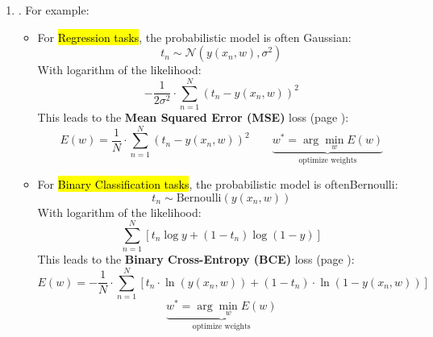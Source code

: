 \begin{enumerate}
    \item {}. For example:
    \begin{itemize}
        \item For \hl{Regression tasks}, the probabilistic model is often Gaussian:
        \begin{equation*}
            t_{n} \sim \mathcal{N}\left(y\left(x_{n}, w\right), \sigma^{2}\right)
        \end{equation*}
        With logarithm of the likelihood:
        \begin{equation*}
            -\dfrac{1}{2 \sigma^{2}} \cdot \sum_{n=1}^{N} \left(t_{n} - y\left(x_{n}, w\right)\right)^{2}
        \end{equation*}
        This leads to the \textbf{Mean Squared Error (MSE)} loss (page \pageref{eq:mse}):
        \begin{equation*}
            E(w) = \dfrac{1}{N} \cdot \sum_{n=1}^{N} \left(t_{n} - y\left(x_{n}, w\right)\right)^{2} \qquad \underbrace{w^{*} = \arg\min_{w} E(w)}_{\text{optimize weights}}
        \end{equation*}

        \item For \hl{Binary Classification tasks}, the probabilistic model is often\break Bernoulli:
        \begin{equation*}
            t_{n} \sim \text{Bernoulli}\left(y\left(x_{n}, w\right)\right)
        \end{equation*}
        With logarithm of the likelihood:
        \begin{equation*}
            \sum_{n=1}^{N} \left[t_{n} \log y + \left(1 - t_{n}\right) \log\left(1 - y\right)\right]
        \end{equation*}
        This leads to the \textbf{Binary Cross-Entropy (BCE)} loss (page \pageref{eq:bce-loss}):
        \begin{equation*}
            E(w) = -\dfrac{1}{N} \cdot \sum_{n=1}^{N} \left[t_{n} \cdot \ln \left(y\left(x_{n}, w\right)\right) + \left(1 - t_{n}\right) \cdot \ln\left(1 - y\left(x_{n}, w\right)\right)\right]
        \end{equation*}
        \begin{equation*}
            \underbrace{w^{*} = \arg\min_{w} E(w)}_{\text{optimize weights}}
        \end{equation*}


\end{itemize}
\end{enumerate}
